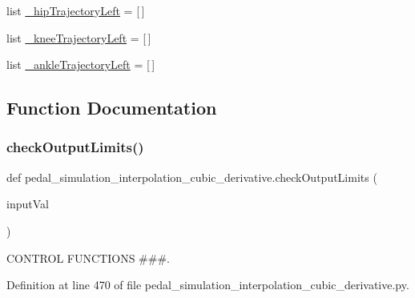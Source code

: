 \begin{DoxyCompactItemize}
\item 
list \mbox{\hyperlink{namespacepedal__simulation__interpolation__cubic__derivative_a65edc5212dc70634c0cf8a16fbe1ba9a}{\+\_\+hip\+Trajectory\+Left}} = \mbox{[}$\,$\mbox{]}
\item 
list \mbox{\hyperlink{namespacepedal__simulation__interpolation__cubic__derivative_a6524f7e52a09b325a00e98b860666f7b}{\+\_\+knee\+Trajectory\+Left}} = \mbox{[}$\,$\mbox{]}
\item 
list \mbox{\hyperlink{namespacepedal__simulation__interpolation__cubic__derivative_aa24a6508fd81e17faaf36ef2f5f28ffb}{\+\_\+ankle\+Trajectory\+Left}} = \mbox{[}$\,$\mbox{]}
\end{DoxyCompactItemize}


\subsection{Function Documentation}
\mbox{\label{namespacepedal__simulation__interpolation__cubic__derivative_a3ddde17d9f15cda662ed533aeee486b2}} 
\subsubsection{\texorpdfstring{checkOutputLimits()}{checkOutputLimits()}}
{\footnotesize\ttfamily def pedal\+\_\+simulation\+\_\+interpolation\+\_\+cubic\+\_\+derivative.\+check\+Output\+Limits (\begin{DoxyParamCaption}\item[{}]{input\+Val }\end{DoxyParamCaption})}



C\+O\+N\+T\+R\+OL F\+U\+N\+C\+T\+I\+O\+NS \#\#\#. 



Definition at line 470 of file pedal\+\_\+simulation\+\_\+interpolation\+\_\+cubic\+\_\+derivative.\+py.


